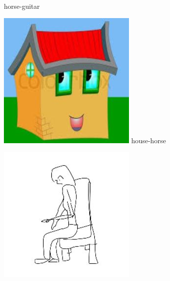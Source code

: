\documentclass{article}
\begin{document}
\begin{center}
\begin{minipage}{0.142\textwidth}
        horse-guitar
    \end{minipage}%
    \begin{minipage}{0.142\textwidth}
        \includegraphics[width=\linewidth]{./pic/misclassified_r5_p4_2723.jpg}
        house-horse
    \end{minipage}%
    \begin{minipage}{0.142\textwidth}
        \includegraphics[width=\linewidth]{./pic/misclassified_r6_p0_2723.jpg}

\end{minipage}
\end{center}
\end{document}
